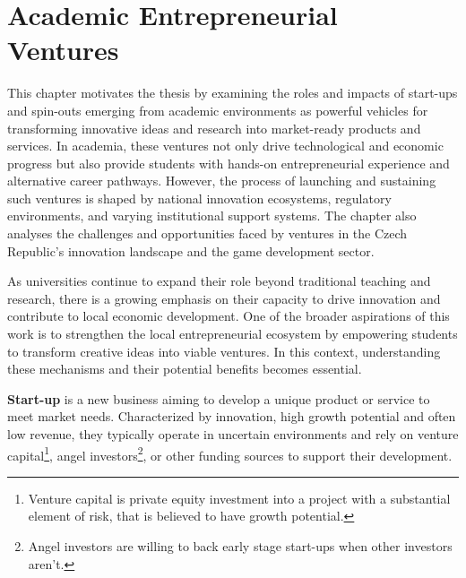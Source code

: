 \chapter{Academic Entrepreneurial Ventures}

\begin{chapterabstract}
	This chapter motivates the thesis by examining the roles and impacts of start-ups and spin-outs emerging from academic environments as powerful vehicles for transforming innovative ideas and research into market-ready products and services. In academia, these ventures not only drive technological and economic progress but also provide students with hands-on entrepreneurial experience and alternative career pathways. However, the process of launching and sustaining such ventures is shaped by national innovation ecosystems, regulatory environments, and varying institutional support systems. The chapter also analyses the challenges and opportunities faced by ventures in the Czech Republic’s innovation landscape and the game development sector.
\end{chapterabstract}

As universities continue to expand their role beyond traditional teaching and research, there is a growing emphasis on their capacity to drive innovation and contribute to local economic development. One of the broader aspirations of this work is to strengthen the local entrepreneurial ecosystem by empowering students to transform creative ideas into viable ventures. In this context, understanding these mechanisms and their potential benefits becomes essential.

\textbf{Start-up} is a new business aiming to develop a unique product or service to meet market needs. Characterized by innovation, high growth potential and often low revenue, they typically operate in uncertain environments and rely on venture capital\footnote{Venture capital is private equity investment into a project with a substantial element of risk, that is believed to have growth potential.}, angel investors\footnote{Angel investors are willing to back early stage start-ups when other investors aren't.}, or other funding sources to support their development.\cite{investopedia_start-ups}

